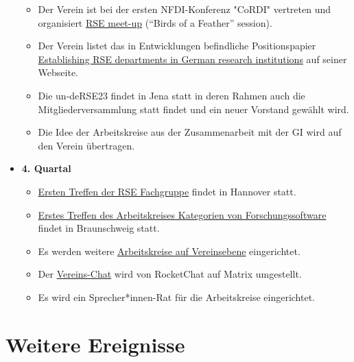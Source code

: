 \begin{itemize}
\begin{itemize}
    \item Der Verein ist bei der ersten NFDI-Konferenz "CoRDI" vertreten und organisiert \href{https://pad.gwdg.de/p/6uV8_9p8h#/}{RSE meet-up} (“Birds of a Feather” session). %
    \item Der Verein listet das in Entwicklungen befindliche Positionspapier \href{https://de-rse.org/de/positions.html#work-in-progress}{\dq Establishing RSE departments in German research institutions\dq{}} auf seiner Webseite.
    \item Die \dq un-deRSE23\dq{} findet in Jena statt in deren Rahmen auch die Mitgliederversammlung statt findet und ein neuer Vorstand gewählt wird.
    \item Die Idee der Arbeitskreise aus der Zusammenarbeit mit der GI wird auf den Verein übertragen.
    
   \end{itemize}
 \item \textbf{4. Quartal}
   \begin{itemize}
    \item \href{https://fg-rse.gi.de/mitteilung/fachgruppentreffen-2023}{Ersten Treffen der RSE Fachgruppe} findet in Hannover statt.
    \item \href{https://fg-rse.gi.de/mitteilung/1-treffen-des-arbeitskreises-kategorien-von-forschungssoftware}{Erstes Treffen des Arbeitskreises Kategorien von Forschungssoftware} findet in Braunschweig statt.
    \item Es werden weitere \href{https://de-rse.org/de/working_groups.html}{Arbeitskreise auf Vereinsebene} eingerichtet.
    \item Der \href{https://de-rse.org/de/matrix.html}{Vereins-Chat} wird von RocketChat auf Matrix umgestellt.
    \item Es wird ein Sprecher*innen-Rat für die Arbeitskreise eingerichtet.
   \end{itemize}
\end{itemize}
\clearpage
\section{Weitere Ereignisse}

